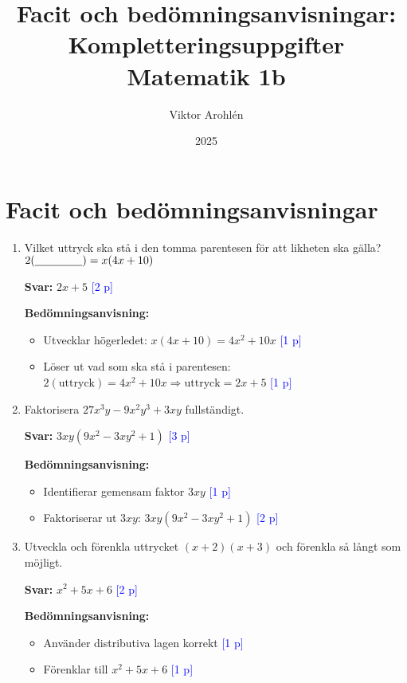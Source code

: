 \documentclass[12pt,a4paper]{article}
\title{Facit och bedömningsanvisningar: Kompletteringsuppgifter Matematik 1b}
\author{Viktor Arohlén}
\date{2025}
\newcommand{\points}[1]{\textcolor{blue}{[#1 p]}}
\begin{document}
\maketitle

\section*{Facit och bedömningsanvisningar}

\begin{enumerate}[label=\textbf{\arabic*.}]
    \item Vilket uttryck ska stå i den tomma parentesen för att likheten ska gälla?
        $2(\underline{\hspace{1.5cm}}) = x (4x + 10)$
        
        \textbf{Svar:} $2x + 5$ \points{2}
        
        \textbf{Bedömningsanvisning:}
        \begin{itemize}
            \item Utvecklar högerledet: $x(4x + 10) = 4x^2 + 10x$ \points{1}
            \item Löser ut vad som ska stå i parentesen: $2(\text{uttryck}) = 4x^2 + 10x \Rightarrow \text{uttryck} = 2x + 5$ \points{1}
        \end{itemize}
    
    \item Faktorisera $27x^3y - 9x^2y^3 + 3xy$ fullständigt.
    
        \textbf{Svar:} $3xy(9x^2 - 3xy^2 + 1)$ \points{3}
        
        \textbf{Bedömningsanvisning:}
        \begin{itemize}
            \item Identifierar gemensam faktor $3xy$ \points{1}
            \item Faktoriserar ut $3xy$: $3xy(9x^2 - 3xy^2 + 1)$ \points{2}
        \end{itemize}
    
    \item Utveckla och förenkla uttrycket $(x + 2)(x + 3)$ och förenkla så långt som möjligt.
    
        \textbf{Svar:} $x^2 + 5x + 6$ \points{2}
        
        \textbf{Bedömningsanvisning:}
        \begin{itemize}
            \item Använder distributiva lagen korrekt \points{1}
            \item Förenklar till $x^2 + 5x + 6$ \points{1}
        \end{itemize}
    

\end{enumerate}
\end{document}
